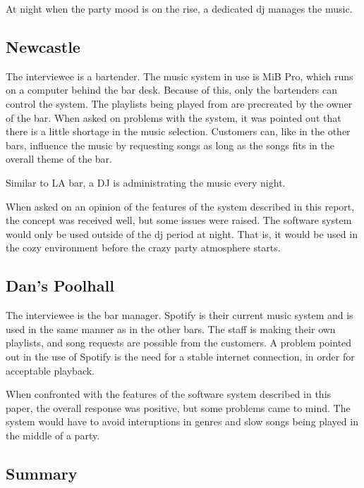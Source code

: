 At night when the party mood is on the rise, a dedicated dj manages the music.

\subsection{Newcastle}
\label{sub:newcastle}

The interviewee is a bartender. The music system in use is MiB Pro, which runs on a computer behind the bar desk. Because of this, only the bartenders can control the system. The playlists being played from are precreated by the owner of the bar. When asked on problems with the system, it was pointed out that there is a little shortage in the music selection. Customers can, like in the other bars, influence the music by requesting songs as long as the songs fits in the overall theme of the bar.

Similar to LA bar, a DJ is administrating the music every night.

When asked on an opinion of the features of the system described in this report, the concept was received well, but some issues were raised. The software system would only be used outside of the dj period at night. That is, it would be used in the cozy environment before the crazy party atmosphere starts.

\subsection{Dan's Poolhall}
\label{sub:dan_s_poolhall}

The interviewee is the bar manager. Spotify is their current music system and is used in the same manner as in the other bars. The staff is making their own playlists, and song requests are possible from the customers. A problem pointed out in the use of Spotify is the need for a stable internet connection, in order for acceptable playback. 

When confronted with the features of the software system described in this paper, the overall response was positive, but some problems came to mind. The system would have to avoid interuptions in genres and slow songs being played in the middle of a party.

\subsection{Summary}
\label{sub:summary}


